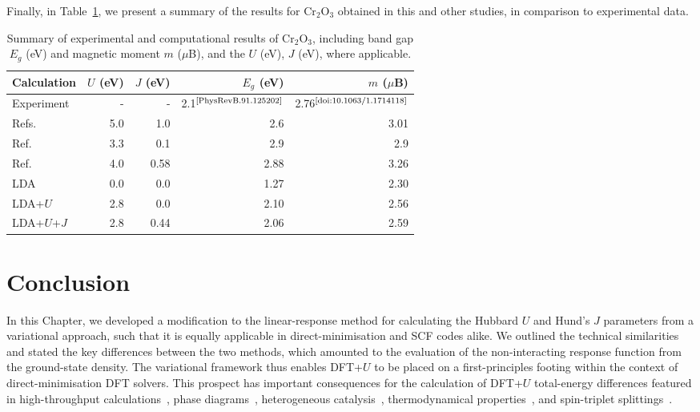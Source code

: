 {
Finally, in Table~\ref{table:cr2o3_summary}, 
we present a summary of the results for Cr$_2$O$_3$
obtained in this and other studies, 
in comparison to experimental data.}
\newpage 

\begin{table}[th!]
\centering
\begin{tabular}{lrrrr}
\hline\hline
Calculation 	&$U$ (eV) &$J$ (eV)&$E_g$ (eV)&$m$ ($\mu$B)\\
\hline
Experiment	& -		& - 		& 2.1$^\textrm{\cite{PhysRevB.91.125202}}$
									&2.76$^\textrm{\cite{doi:10.1063/1.1714118}}$ \\
Refs.~\cite{PhysRevB.70.125426,C0JM03852K,doi:10.1021/jp5039943,Mosey2009287,doi:10.1021/jp5039943}	
			& 5.0		& 1.0		& 2.6		& 3.01\\
Ref.~\cite{PhysRevB.76.155123,doi:10.1063/1.4865780,doi:10.1063/1.2943142,Mosey2009287}	
			& 3.3 	& 0.1 	& 2.9 	& 2.9 \\
Ref.~\cite{PhysRevB.71.035105}
			& 4.0 	& 0.58 	& 2.88 	&3.26\\
\hline
LDA			& 0.0		& 0.0 	&1.27	&2.30\\
LDA+$U$		& 2.8 	& 0.0		&2.10	&2.56\\ 
LDA+$U$+$J$	& 2.8 	& 0.44	&2.06	&2.59\\ 
\hline\hline
\end{tabular}
\caption{Summary of experimental and 
computational results of Cr$_2$O$_3$, 
including band gap $E_g$ (eV) 
and magnetic moment $m$ ($\mu$B), 
and the $U$ (eV), $J$ (eV), where applicable.}
\label{table:cr2o3_summary} 
\end{table}


\section{Conclusion}

{
In this Chapter, 
we developed a modification to the linear-response method  
for calculating the Hubbard $U$ and Hund's $J$ parameters 
from a variational approach, 
such that it is equally applicable in 
direct-minimisation and SCF codes alike.
%
We outlined the technical similarities and 
stated the key differences between the two methods, 
which amounted to the evaluation of the 
non-interacting response function 
from the ground-state density.
%
The variational framework thus enables 
DFT+$U$ to be placed 
on a first-principles footing within the context 
of direct-minimisation DFT solvers.
%
This prospect has important consequences for the 
calculation of DFT+$U$  total-energy differences 
{featured in high-throughput calculations~\cite{jain2011high,setyawan2010high,curtarolo,Curtarolo2012218,PhysRevX.5.011006}, 
phase diagrams~\cite{PhysRevB.87.115111,PhysRevB.84.045115,doi:10.1021/cm702327g}, 
heterogeneous catalysis~\cite{Bliem1215},
thermodynamical properties~\cite{PhysRevB.75.035109,PhysRevB.78.075125,PhysRevB.75.035115,1674-1056-17-4-035,doi:10.1021/cm702327g,CapdevilaCortada201558,PhysRevB.85.155208,PhysRevB.84.045115,PhysRevB.85.115104,PhysRevB.90.115105}, 
and spin-triplet splittings~\cite{Korshunov2004,PhysRevB.55.12829,PhysRevB.77.045118}}. 
}

